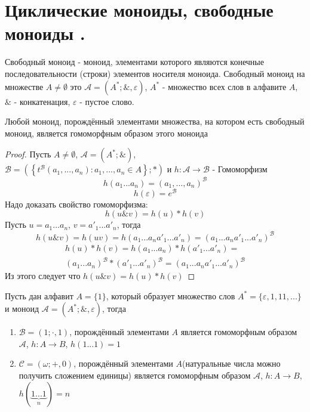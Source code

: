 \documentclass[../main/document.tex]{subfiles}
\begin{document}
\section{Циклические моноиды, свободные моноиды .}
\begin{dfn}
Свободный моноид - моноид, элементами которого являются конечные последовательности (строки) элементов носителя моноида. Свободный моноид на множестве $A\neq \emptyset$ это $\mathcal{A}=(A^*;\&,\varepsilon)$, $A^*$ - множество всех слов в алфавите $A$, $\&$ - конкатенация, $\varepsilon$ - пустое слово.
\end{dfn}
\begin{thm}
Любой моноид, порождённый элементами множества, на котором есть свободный моноид, является гомоморфным образом этого моноида
\begin{proof}
Пусть $A\neq \emptyset$, $\mathcal{A}=(A^*;\&)$,\\ $\mathcal{B}=(\left\{t^{\mathcal{B}}(a_1,...,a_n): a_1,...,a_n\in A\right\};*)$ и $h:\mathcal{A}\rightarrow \mathcal{B}$ - Гомоморфизм
$$h(a_1...a_n)=(a_1,...,a_n)^{\mathcal{B}}$$
$$h(\varepsilon)=e^{\mathcal{B}}$$
Надо доказать свойство гомоморфизма:
$$h(u\&v)=h(u)*h(v)$$
Пусть $u=a_1...a_n$, $v={a'}_1...{a'}_n$, тогда
$$h(u\&v)=h(uv)=h(a_1...a_n{a'}_1...{a'}_n)=(a_1...a_n{a'}_1...{a'}_n)^{\mathcal{B}}$$
\begin{multline*}
h(u)*h(v)=h(a_1...a_n)*h({a'}_1...{a'}_n)=\\
(a_1...a_n)^{\mathcal{B}}*({a'}_1...{a'}_n)^{\mathcal{B}}=(a_1...a_n{a'}_1...{a'}_n)^{\mathcal{B}}
\end{multline*}
Из этого следует что $h(u\&v)=h(u)*h(v)$
\end{proof}
\end{thm}
\begin{exm}

Пусть дан алфавит $A=\{1\}$, который образует множество слов $A^*=\{\varepsilon,1,11,...\}$ и моноид $\mathcal{A}=(A^*;\&,\varepsilon)$, тогда
\begin{enumerate}
\item $\mathcal{B}=({1};\cdot,1)$, порождённый элементами $A$ является гомоморфным образом $\mathcal{A}$, $h:A\rightarrow B$, $h(1...1)=1$
\item $\mathcal{C}=(\omega;+,0)$, порождённый элементами $A$(натуральные числа можно получить сложением единицы) является гомоморфным образом $\mathcal{A}$, $h:A\rightarrow B$, $h(\underbrace{1...1}_n)=n$
\end{enumerate}
\end{exm}
\end{document}
